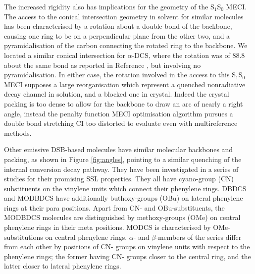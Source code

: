 The increased rigidity also has implications for the geometry of the S$_1$\textendash{}S$_0$ MECI. The access to the conical intersection geometry in solvent for similar molecules has been characterised by a rotation about a double bond of the backbone, causing one ring to be on a perpendicular plane from the other two, and a pyramidalisation of the carbon connecting the rotated ring to the backbone.\cite{Izquierdo2019} We located a similar conical intersection for $\alpha$-DCS, where the rotation was of 88.8\degree{} about the same bond as reported in Reference , but involving no pyramidalisation. In either case, the rotation involved in the access to this S$_1$\textendash{}S$_0$ MECI supposes a large reorganisation which represent a quenched nonradiative decay channel in solution, and a blocked one in crystal. Indeed the crystal packing is too dense to allow for the backbone to draw an arc of nearly a right angle, instead the penalty function MECI optimisation algorithm pursues a double bond stretching CI too distorted to evaluate even with multireference methods.

Other emissive DSB-based molecules have similar molecular backbones and packing, as shown in Figure \ref{fig:angles}, pointing to a similar quenching of the internal conversion decay pathway. They have been investigated in a series of studies for their promising SSL properties.\cite{Shi2017,Shi2019,Izquierdo2019} They all have cyano-group (CN) substituents on the vinylene units which connect their phenylene rings. DBDCS and MODBDCS have additionally buthoxy-groups (OBu) on lateral phenylene rings at their para positions. Apart from CN- and OBu-substituents, the MODBDCS molecules are distinguished by methoxy-groups (OMe) on central phenylene rings in their meta positions. MODCS is characterised by OMe-substitutions on central phenylene rings. $\alpha$- and $\beta$-members of the series differ from each other by positions of CN- groups on vinylene units with respect to the phenylene rings; the former having CN- groups closer to the central ring, and the latter closer to lateral phenylene rings. 

